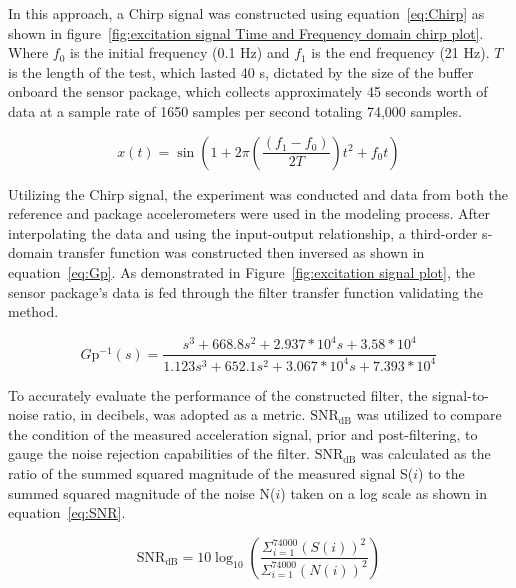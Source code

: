 \documentclass[]{spie}  %
\begin{document}
	In this approach, a Chirp signal was constructed using equation~\ref{eq:Chirp} as shown in figure~\ref{fig:excitation signal Time and Frequency domain chirp plot}. Where $f_0$ is the initial frequency (0.1 Hz) and $f_1$ is the end frequency (21 Hz). $T$ is the length of the test, which lasted 40 s, dictated by the size of the buffer onboard the sensor package, which collects approximately 45 seconds worth of data at a sample rate of 1650 samples per second totaling 74,000 samples.
	
	\begin{equation} 
		\label{eq:Chirp}
		x(t)=\sin(1 + 2\pi ( \frac{(f_1-f_0)}{2T} ) t^2 + f_0 t) \, 
	\end{equation}
	

	
	Utilizing the Chirp signal, the experiment was conducted and data from both the reference and package accelerometers were used in the modeling process. After interpolating the data and using the input-output relationship, a third-order s-domain transfer function was constructed then inversed as shown in equation~\ref{eq:Gp}. As demonstrated in Figure~\ref{fig:excitation signal plot}, the sensor package's data is fed through the filter transfer function validating the method. 
	
	\begin{equation}
		\label{eq:Gp}
			G\text{p}^{-1}(s) = \frac{s^3  + 668.8 s^2  + 2.937*10^4 s + 3.58*10^4}{1.123 s^3  + 652.1 s^2  + 3.067*10^4 s + 7.393*10^4} \,
	\end{equation}

To accurately evaluate the performance of the constructed filter, the signal-to-noise ratio, in decibels, was adopted as a metric. $\text{SNR}_{\text{dB}}$ was utilized to compare the condition of the measured acceleration signal, prior and post-filtering, to gauge the noise rejection capabilities of the filter. $\text{SNR}_{\text{dB}}$ was calculated as the ratio of the summed squared magnitude of the measured signal S($i$) to the summed squared magnitude of the noise N($i$) taken on a log scale as shown in equation~\ref{eq:SNR}.~\cite{Johnson2006}

	\begin{equation}
		\label{eq:SNR}
		\text{SNR}_{\text{dB}} =10 \log_{10}(\frac{\Sigma^{74000}_{i=1}(S(i))^2}{\Sigma^{74000}_{i=1}(N(i))^2}) \, 
	\end{equation}
\end{document}
